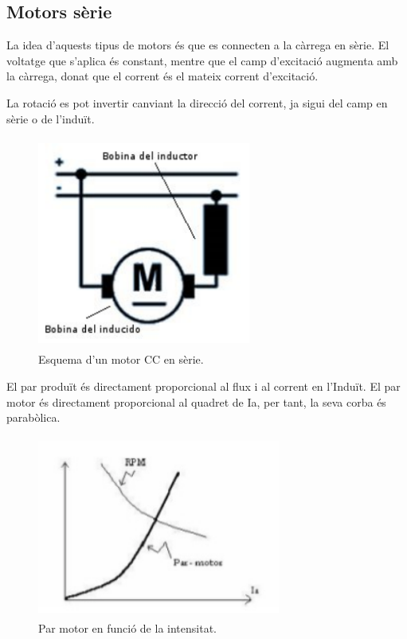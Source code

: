 \subsection{Motors sèrie}
La idea d'aquests tipus de motors és que es connecten a la càrrega en sèrie. El voltatge que s'aplica és constant, mentre que el camp d'excitació augmenta amb la càrrega, donat que el corrent és el mateix corrent d'excitació.

La rotació es pot invertir canviant la direcció del corrent, ja sigui del camp en sèrie o de l'induït.

\begin{figure}[H]
		\centering
    	\includegraphics[width=7cm, height=7cm]{Motors/motordcserie.png}
     	\caption{Esquema d'un motor CC en sèrie.} 
\end{figure}

El par produït és directament proporcional al flux i al corrent en l'Induït. El par motor és directament proporcional al quadret de Ia, per tant, la seva corba és parabòlica.

\begin{figure}[H]
		\centering
   	\includegraphics[width=8cm, height=6cm]{Motors/parrpm.png}
     	\caption{Par motor en funció de la intensitat. } 
\end{figure}

